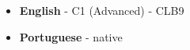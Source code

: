 \vspace{-6pt}

\begin{itemize}
        \item \textbf{English} - C1 (Advanced) - CLB9
        \item \textbf{Portuguese} - native
\end{itemize}
